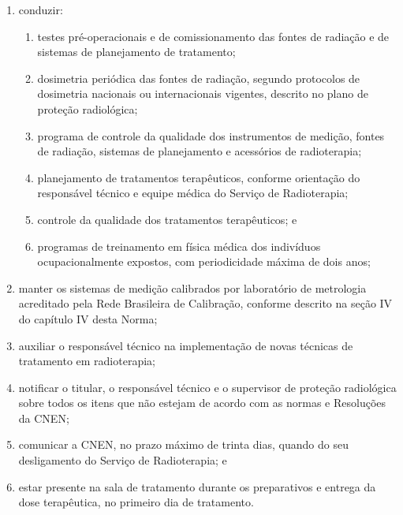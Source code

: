 \begin{enumerate}[label=\Roman*.]
\item conduzir:
    \begin{enumerate}
        \item testes pré-operacionais e de comissionamento das fontes de 	radiação e de sistemas de planejamento de tratamento;
        \item dosimetria periódica das fontes de radiação, segundo protocolos 	de dosimetria nacionais ou internacionais vigentes, descrito no plano de 	proteção radiológica;
        \item programa de controle da qualidade dos instrumentos de medição, 	fontes de radiação, sistemas de planejamento e acessórios de radioterapia;
        \item planejamento de tratamentos terapêuticos, conforme orientação 	do responsável técnico e equipe médica do Serviço de Radioterapia;	
        \item controle da qualidade dos tratamentos terapêuticos; e
        \item programas de treinamento em física médica dos indivíduos ocupacionalmente expostos, com periodicidade máxima de dois anos;
    \end{enumerate}
\item manter os sistemas de medição calibrados por laboratório de metrologia acreditado pela Rede Brasileira de Calibração, conforme descrito na seção IV do capítulo IV desta Norma;
\item auxiliar o responsável técnico na implementação de novas técnicas de tratamento em radioterapia;	
\item notificar o titular, o responsável técnico e o supervisor de proteção radiológica sobre todos os itens que não estejam de acordo com as normas e Resoluções da CNEN;
\item comunicar a CNEN, no prazo máximo de trinta dias, quando do seu desligamento do Serviço de Radioterapia; e
\item estar presente na sala de tratamento durante os preparativos e entrega da dose terapêutica, no primeiro dia de tratamento.
\end{enumerate}